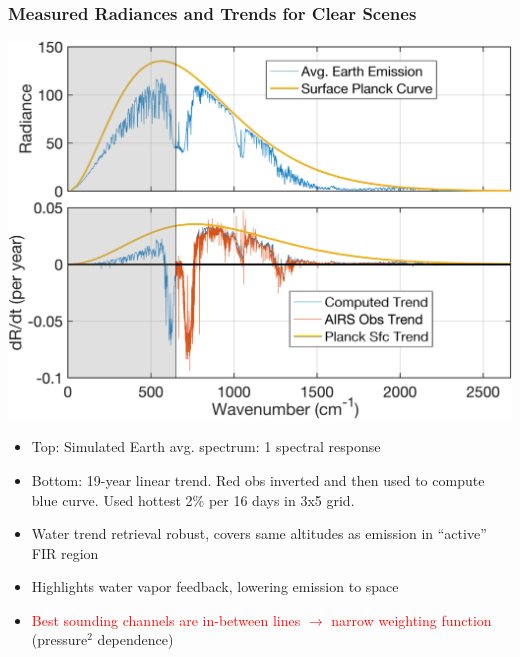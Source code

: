 \documentclass[10pt,t]{beamer}
\begin{document}
\begin{frame}
\frametitle{Measured Radiances and Trends for Clear Scenes}
\centering \includegraphics[width=0.6\linewidth]{Figslls/rad_trends_all_cm.png}
\begin{small}
\begin{itemize}
\item Top: Simulated Earth avg. spectrum: 1 \wn spectral response
\item Bottom: 19-year linear trend.  Red obs inverted and then used to compute blue curve.  Used hottest 2\% per 16 days in 3x5 grid.
\item Water trend retrieval robust, covers same altitudes as emission in ``active'' FIR region
\item Highlights water vapor feedback, lowering emission to space
\item \textcolor{red}{Best sounding channels are in-between lines $\rightarrow$ narrow weighting function} (pressure$^2$ dependence)
\end{itemize}
\end{small}
\end{frame}
\end{document}
